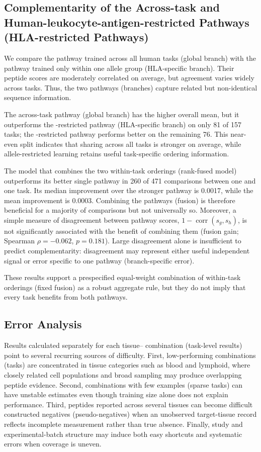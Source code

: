 \subsection{Complementarity of the Across-task and Human-leukocyte-antigen-restricted Pathways (HLA-restricted Pathways)}

We compare the pathway trained across all human tasks (global branch) with the pathway trained only within one \plainHLA{} allele group (HLA-specific branch). Their peptide scores are moderately correlated on average, but agreement varies widely across tasks. Thus, the two pathways (branches) capture related but non-identical sequence information.

The across-task pathway (global branch) has the higher overall mean, but it outperforms the \plainHLA{}-restricted pathway (HLA-specific branch) on only 81 of 157 tasks; the \plainHLA{}-restricted pathway performs better on the remaining 76. This near-even split indicates that sharing across all tasks is stronger on average, while allele-restricted learning retains useful task-specific ordering information.

The model that combines the two within-task orderings (rank-fused model) outperforms its better single pathway in 260 of 471 comparisons between one \plainSeed{} and one task. Its median improvement over the stronger pathway is 0.0017, while the mean improvement is 0.0003. Combining the pathways (fusion) is therefore beneficial for a majority of comparisons but not universally so. Moreover, a simple measure of disagreement between pathway scores, \(1-\operatorname{corr}(s_g,s_h)\), is not significantly associated with the benefit of combining them (fusion gain; Spearman \(\rho=-0.062\), \(p=0.181\)). Large disagreement alone is insufficient to predict complementarity: disagreement may represent either useful independent signal or error specific to one pathway (branch-specific error).

These results support a prespecified equal-weight combination of within-task orderings (fixed fusion) as a robust aggregate rule, but they do not imply that every task benefits from both pathways.

\subsection{Error Analysis}

Results calculated separately for each tissue--\plainHLA{} combination (task-level results) point to several recurring sources of difficulty. First, low-performing combinations (tasks) are concentrated in tissue categories such as blood and lymphoid, where closely related cell populations and broad sampling may produce overlapping peptide evidence. Second, combinations with few examples (sparse tasks) can have unstable estimates even though training size alone does not explain performance. Third, peptides reported across several tissues can become difficult constructed negatives (pseudo-negatives) when an unobserved target-tissue record reflects incomplete measurement rather than true absence. Finally, study and experimental-batch structure may induce both easy shortcuts and systematic errors when coverage is uneven.
